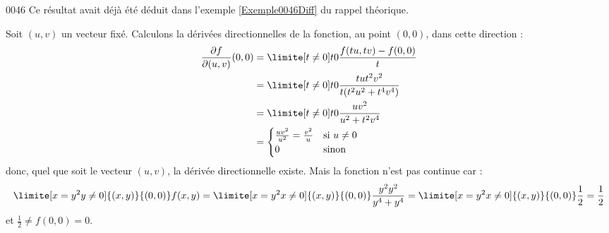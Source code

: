 \begin{corrige}{0046}
Ce résultat avait déjà été déduit dans l'exemple \ref{Exemple0046Diff} du rappel théorique.



\begin{alternative}
	
Soit $(u,v)$ un vecteur fixé. Calculons la dérivées directionnelles de
la fonction, au point $(0,0)$, dans cette direction :
\begin{equation*}
  \begin{split}
    \frac{\partial f}{\partial(u,v)}(0,0) &= \limite[t\neq0] t 0
    \frac{f(tu, tv)   - f(0,0)}{t}\\
    &=\limite[t\neq0] t 0  \frac{t u t^2 v^2}{t(t^2 u^2 + t^4 v^4)}\\
    &=\limite[t\neq0] t 0  \frac{u v^2}{u^2 + t^2 v^4}\\
    &=
    \begin{cases}
      \frac{uv^2}{u^2} = \frac{v^2}u & \text{si }u \neq 0\\
      0 & \text{sinon}
    \end{cases}
  \end{split}
\end{equation*}
donc, quel que soit le vecteur $(u,v)$, la dérivée directionnelle
existe. Mais la fonction n'est pas continue car :
\begin{equation*}
  \limite[x=y^2\\y\neq0]{(x,y)}{(0,0)} f(x,y) =%
  \limite[x=y^2\\x\neq0]{(x,y)}{(0,0)} \frac{y^2 y^2}{y^4 + y^4} =%
  \limite[x=y^2\\x\neq0]{(x,y)}{(0,0)} \frac 12 = \frac 12
\end{equation*}
et $\frac12 \neq f(0,0) = 0$.


\end{alternative}

\end{corrige}
